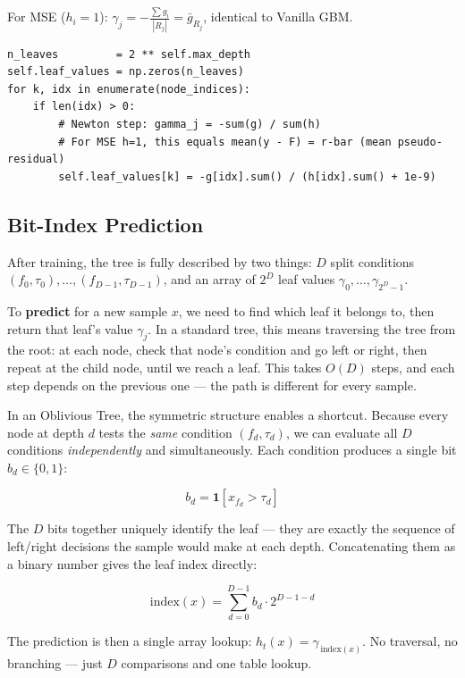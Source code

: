 \documentclass[11pt, a4paper]{article}
\begin{document}
For MSE ($h_i = 1$): $\gamma_j = -\frac{\sum g_i}{|R_j|} = \bar{g}_{R_j}$,
identical to Vanilla GBM.

\begin{listing}[H]
\caption{Leaf value assignment (\texttt{tree.py})}
\begin{verbatim}
n_leaves         = 2 ** self.max_depth
self.leaf_values = np.zeros(n_leaves)
for k, idx in enumerate(node_indices):
    if len(idx) > 0:
        # Newton step: gamma_j = -sum(g) / sum(h)
        # For MSE h=1, this equals mean(y - F) = r-bar (mean pseudo-residual)
        self.leaf_values[k] = -g[idx].sum() / (h[idx].sum() + 1e-9)
\end{verbatim}
\end{listing}

\subsection{Bit-Index Prediction}

After training, the tree is fully described by two things:
$D$ split conditions $(f_0, \tau_0), \ldots, (f_{D-1}, \tau_{D-1})$,
and an array of $2^D$ leaf values $\gamma_0, \ldots, \gamma_{2^D - 1}$.

To \textbf{predict} for a new sample $x$, we need to find which leaf it
belongs to, then return that leaf's value $\gamma_j$.
In a standard tree, this means traversing the tree from the root:
at each node, check that node's condition and go left or right,
then repeat at the child node, until we reach a leaf.
This takes $O(D)$ steps, and each step depends on the previous one
--- the path is different for every sample.

In an Oblivious Tree, the symmetric structure enables a shortcut.
Because every node at depth $d$ tests the \emph{same} condition $(f_d, \tau_d)$,
we can evaluate all $D$ conditions \emph{independently} and simultaneously.
Each condition produces a single bit $b_d \in \{0, 1\}$:

\[
b_d = \mathbf{1}\!\left[x_{f_d} > \tau_d\right]
\]

The $D$ bits together uniquely identify the leaf --- they are exactly
the sequence of left/right decisions the sample would make at each depth.
Concatenating them as a binary number gives the leaf index directly:

\[
\mathrm{index}(x) = \sum_{d=0}^{D-1} b_d \cdot 2^{D-1-d}
\]

The prediction is then a single array lookup: $h_t(x) = \gamma_{\,\mathrm{index}(x)}$.
No traversal, no branching --- just $D$ comparisons and one table lookup.
\end{document}
